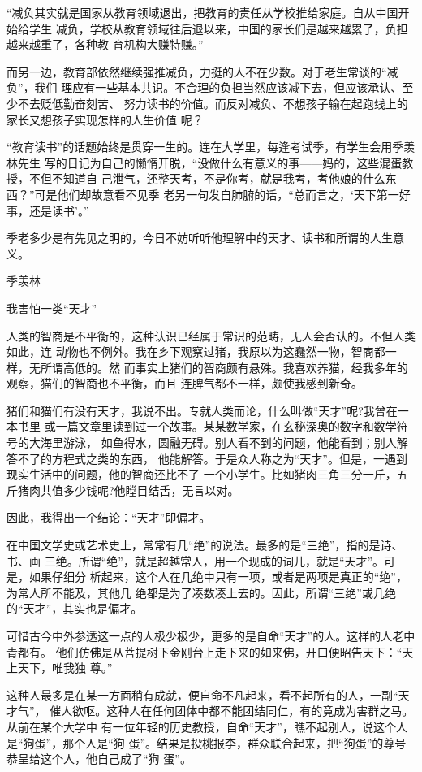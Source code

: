 \documentclass[11pt]{ctexart}
\begin{document}
{{{{“减负其实就是国家从教育领域退出，把教育的责任从学校推给家庭。自从中国开始给学生
减负，学校从教育领域往后退以来，中国的家长们是越来越累了，负担越来越重了，各种教
育机构大赚特赚。”

而另一边，教育部依然继续强推减负，力挺的人不在少数。对于老生常谈的“减负”，我们
理应有一些基本共识。不合理的负担当然应该减下去，但应该承认、至少不去贬低勤奋刻苦、
努力读书的价值。而反对减负、不想孩子输在起跑线上的家长又想孩子实现怎样的人生价值
呢？

“教育读书”的话题始终是贯穿一生的。连在大学里，每逢考试季，有学生会用季羡林先生
写的日记为自己的懒惰开脱，“没做什么有意义的事——妈的，这些混蛋教授，不但不知道自
己泄气，还整天考，不是你考，就是我考，考他娘的什么东西？”可是他们却故意看不见季
老另一句发自肺腑的话，“总而言之，‘天下第一好事，还是读书’。”

季老多少是有先见之明的，今日不妨听听他理解中的天才、读书和所谓的人生意义。



季羡林

我害怕一类“天才”

人类的智商是不平衡的，这种认识已经属于常识的范畴，无人会否认的。不但人类如此，连
动物也不例外。我在乡下观察过猪，我原以为这蠢然一物，智商都一样，无所谓高低的。然
而事实上猪们的智商颇有悬殊。我喜欢养猫，经我多年的观察，猫们的智商也不平衡，而且
连脾气都不一样，颇使我感到新奇。

猪们和猫们有没有天才，我说不出。专就人类而论，什么叫做“天才”呢?我曾在一本书里
或一篇文章里读到过一个故事。某某数学家，在玄秘深奥的数字和数学符号的大海里游泳，
如鱼得水，圆融无碍。别人看不到的问题，他能看到；别人解答不了的方程式之类的东西，
他能解答。于是众人称之为“天才”。但是，一遇到现实生活中的问题，他的智商还比不了
一个小学生。比如猪肉三角三分一斤，五斤猪肉共值多少钱呢?他瞠目结舌，无言以对。

因此，我得出一个结论：“天才”即偏才。

在中国文学史或艺术史上，常常有几“绝”的说法。最多的是“三绝”，指的是诗、书、画
三绝。所谓“绝”，就是超越常人，用一个现成的词儿，就是“天才”。可是，如果仔细分
析起来，这个人在几绝中只有一项，或者是两项是真正的“绝”，为常人所不能及，其他几
绝都是为了凑数凑上去的。因此，所谓“三绝”或几绝的“天才”，其实也是偏才。

可惜古今中外参透这一点的人极少极少，更多的是自命“天才”的人。这样的人老中青都有。
他们仿佛是从菩提树下金刚台上走下来的如来佛，开口便昭告天下：“天上天下，唯我独
尊。”

这种人最多是在某一方面稍有成就，便自命不凡起来，看不起所有的人，一副“天才气”，
催人欲呕。这种人在任何团体中都不能团结同仁，有的竟成为害群之马。从前在某个大学中
有一位年轻的历史教授，自命“天才”，瞧不起别人，说这个人是“狗蛋”，那个人是“狗
蛋”。结果是投桃报李，群众联合起来，把“狗蛋”的尊号恭呈给这个人，他自己成了“狗
蛋”。

}}}}
\end{document}
